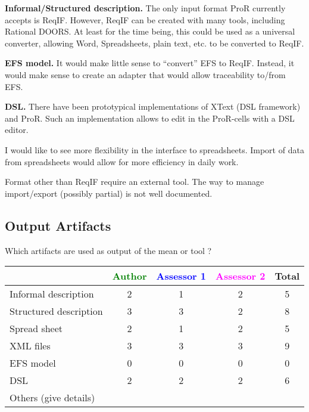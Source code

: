 \begin{author_comment}

\textbf{Informal/Structured description.} The only input format ProR currently accepts is ReqIF.  However, ReqIF can be created with many tools, including Rational DOORS.  At least for the time being, this could be used as a universal converter, allowing Word, Spreadsheets, plain text, etc. to be converted to ReqIF.

\textbf{EFS model.} It would make little sense to ``convert'' EFS to ReqIF.  Instead, it would make sense to create an adapter that would allow traceability to/from EFS.

\textbf{DSL.} There have been prototypical implementations of XText (DSL framework) and ProR.  Such an implementation allows to edit in the ProR-cells with a DSL editor.
\end{author_comment}

\begin{assessor1}
I would like to see more flexibility in the interface to spreadsheets. Import of data from spreadsheets would allow for more efficiency in daily work. 
\end{assessor1}

\begin{assessor2}
Format other than ReqIF require an external tool. The way to manage import/export (possibly partial) is not well documented.
\end{assessor2}

\subsection{Output Artifacts}

Which artifacts are used as output of the mean or tool  ?


\begin{tabular}{|l | c | c | c | c|}
\hline
& \textcolor{green}{Author} & \textcolor{blue}{Assessor 1} & \textcolor{magenta}{Assessor 2} & Total \\
\hline
Informal description & 2 & 1 & 2 & 5 \\
\hline
Structured description & 3 & 3 & 2 & 8 \\
\hline
Spread sheet & 2 & 1 & 2 & 5 \\
\hline
XML files & 3 & 3 & 3 & 9 \\
\hline
EFS model & 0 & 0 & 0 & 0 \\
\hline
DSL & 2 & 2 & 2 & 6 \\
\hline
Others (give details) & & & & \\
\hline
\end{tabular}

